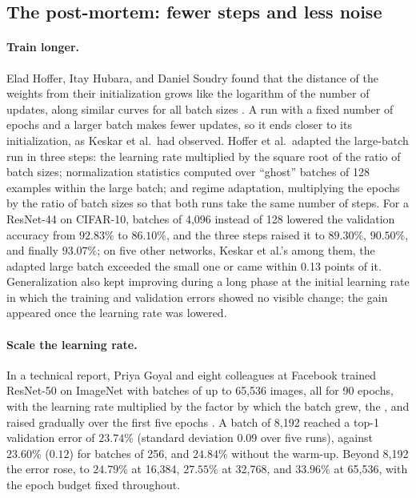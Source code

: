 \begin{refsection}
\section{The post-mortem: fewer steps and less noise}\label{sec:heldfixed:postmortem}

\paragraph{Train longer.} Elad Hoffer, Itay Hubara, and Daniel Soudry found that the distance of the weights from their initialization grows like the logarithm of the number of updates, along similar curves for all batch sizes \parencite{HofferEtAl2017}. A run with a fixed number of epochs and a larger batch makes fewer updates, so it ends closer to its initialization, as Keskar et al.\ had observed. Hoffer et al.\ adapted the large-batch run in three steps: the learning rate multiplied by the square root of the ratio of batch sizes; normalization statistics computed over \enquote{ghost} batches of 128 examples within the large batch; and regime adaptation, multiplying the epochs by the ratio of batch sizes so that both runs take the same number of steps. For a ResNet-44 on CIFAR-10, batches of 4,096 instead of 128 lowered the validation accuracy from $92.83\%$ to $86.10\%$, and the three steps raised it to $89.30\%$, $90.50\%$, and finally $93.07\%$; on five other networks, Keskar et al.'s among them, the adapted large batch exceeded the small one or came within 0.13 points of it. Generalization also kept improving during a long phase at the initial learning rate in which the training and validation errors showed no visible change; the gain appeared once the learning rate was lowered.

\paragraph{Scale the learning rate.} In a technical report, Priya Goyal and eight colleagues at Facebook trained ResNet-50 on ImageNet with batches of up to 65,536 images, all for 90 epochs, with the learning rate multiplied by the factor by which the batch grew, the , and raised gradually over the first five epochs \parencite{GoyalEtAl2017}. A batch of 8,192 reached a top-1 validation error of $23.74\%$ (standard deviation $0.09$ over five runs), against $23.60\%$ ($0.12$) for batches of 256, and $24.84\%$ without the warm-up. Beyond 8,192 the error rose, to $24.79\%$ at 16,384, $27.55\%$ at 32,768, and $33.96\%$ at 65,536, with the epoch budget fixed throughout.


\end{refsection}
